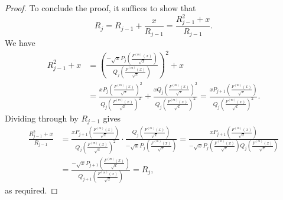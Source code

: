 \documentclass[12pt]{amsart}
\newcommand{\gfnoa}[1]{F^{(#1)}(x)}
\begin{document}
\begin{proof}
    To conclude the proof, it suffices to show that
    \[
    R_j=R_{j-1}+\frac{x}{R_{j-1}}=\frac{R_{j-1}^2+x}{R_{j-1}}.
    \]
    We have
    \begin{align*}
    R_{j-1}^2+x&=\left(\frac{-\sqrt{x}P_j\!\left(\frac{\gfnoa{m}}{\sqrt{x}}\right)}{Q_{j}\!\left(\frac{\gfnoa{m}}{\sqrt{x}}\right)}\right)^2+x
    \\
    &=\frac{xP_{j}\!\left(\frac{\gfnoa{m}}{\sqrt{x}}\right)^2}{Q_{j}\!\left(\frac{\gfnoa{m}}{\sqrt{x}}\right)^2}+\frac{xQ_{j}\!\left(\frac{\gfnoa{m}}{\sqrt{x}}\right)^2}{Q_{j}\!\left(\frac{\gfnoa{m}}{\sqrt{x}}\right)^2}
    =\frac{xP_{j+1}\left(\frac{\gfnoa{m}}{\sqrt{x}}\right)}{Q_{j}\!\left(\frac{\gfnoa{m}}{\sqrt{x}}\right)^2}.
    \end{align*}
    Dividing through by $R_{j-1}$ gives
    \begin{align*}
        \frac{R_{j-1}^2+x}{R_{j-1}}&=\frac{xP_{j+1}\left(\frac{\gfnoa{m}}{\sqrt{x}}\right)}{Q_{j}\!\left(\frac{\gfnoa{m}}{\sqrt{x}}\right)^2}\cdot\frac{Q_{j}\!\left(\frac{\gfnoa{m}}{\sqrt{x}}\right)}{-\sqrt{x}P_j\!\left(\frac{\gfnoa{m}}{\sqrt{x}}\right)}
        =\frac{xP_{j+1}\left(\frac{\gfnoa{m}}{\sqrt{x}}\right)}{-\sqrt{x}P_{j}\!\left(\frac{\gfnoa{m}}{\sqrt{x}}\right)Q_{j}\!\left(\frac{\gfnoa{m}}{\sqrt{x}}\right)}\\
        &=\frac{-\sqrt{x}P_{j+1}\!\left(\frac{\gfnoa{m}}{\sqrt{x}}\right)}{Q_{j+1}\!\left(\frac{\gfnoa{m}}{\sqrt{x}}\right)}
        =R_j,
    \end{align*}
    as required.
\end{proof}
\end{document}
